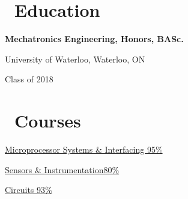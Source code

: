 \documentclass{resume}
\begin{document}
\begin{comment}
\datedsubsection{\textbf{Hackathons}}{Various}
\begin{itemize}
  \item \href{https://github.com/DChang87/HtN}{Pebble-run dosage notification service - \textit{SmartMeds}; used C.} \hfill Hack the North, 2015
  \item \href{jkkd.com}{IMU-based instructor - \textit{Yoga Yoda}; developed business case. \hfill} PCH Hardware Hackathon, 2015
  \item \href{http://devpost.com/software/drumyo}{Myo-controlled air drum kit - \textit{DruMyo}; used C++. \hfill} hackWaterloo, 2014
  \item \href{https://github.com/fanwashere/SolidWorksControls}{Myo-enabled Solidworks controller; used Lua. \hfill} Hack the North, 2014
\end{itemize}
\end{comment}

\begin{multicols}{2}

\section{\faGraduationCap\ Education}
\textbf{Mechatronics Engineering, Honors, BASc.}\par
University of Waterloo, Waterloo, ON\par
Class of 2018

\columnbreak

\section{\faBook\ Courses}

\href{http://www.ucalendar.uwaterloo.ca/1516/COURSE/course-MTE.html#MTE341}{Microprocessor Systems \& Interfacing \hfill 95\%} \par
\href{http://www.ucalendar.uwaterloo.ca/1516/COURSE/course-MTE.html#MTE220}{Sensors \& Instrumentation\hfill 80\%}\par
\href{http://www.ucalendar.uwaterloo.ca/1516/COURSE/course-MTE.html#MTE120}{Circuits \hfill 93\%}

\end{multicols}
\end{document}
